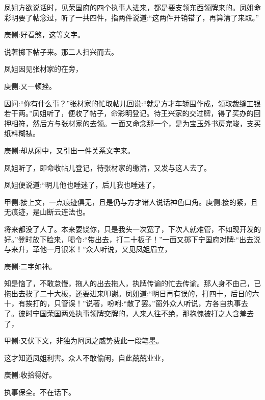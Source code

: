 \begin{parag}
    凤姐方欲说话时，见荣国府的四个执事人进来，都是要支领东西领牌来的。凤姐命彩明要了帖念过，听了一共四件，指两件说道:“这两件开销错了，再算清了来取。”\begin{note}庚侧:好看煞，这等文字。\end{note}说著掷下帖子来。那二人扫兴而去。
\end{parag}


\begin{parag}
    凤姐因见张材家的在旁，\begin{note}庚侧:又一顿挫。\end{note}因问:“你有什么事？”张材家的忙取帖儿回说:“就是方才车轿围作成，领取裁缝工银若干两。”凤姐听了，便收了帖子，命彩明登记。待王兴家的交过牌，得了买办的回押相符，然后方与张材家的去领。一面又命念那一个，是为宝玉外书房完竣，支买纸料糊裱。\begin{note}庚侧:却从闲中，又引出一件关系文字来。\end{note}凤姐听了，即命收帖儿登记，待张材家的缴清，又发与这人去了。
\end{parag}


\begin{parag}
    凤姐便说道:“明儿他也睡迷了，后儿我也睡迷了，\begin{note}甲侧:接上文，一点痕迹俱无，且是仍与方才诸人说话神色口角。庚侧:接的紧，且无痕迹，是山断云连法也。\end{note}将来都没了人了。本来要饶你，只是我头一次宽了，下次人就难管，不如现开发的好。”登时放下脸来，喝令:“带出去，打二十板子！”一面又掷下宁国府对牌:“出去说与来升，革他一月银米！”众人听说，又见凤姐眉立，\begin{note}庚侧:二字如神。\end{note}知是恼了，不敢怠慢，拖人的出去拖人，执牌传谕的忙去传谕。那人身不由己，已拖出去挨了二十大板，还要进来叩谢。凤姐道:“明日再有误的，打四十，后日的六十，有挨打的，只管误！”说著，吩咐:“散了罢。”窗外众人听说，方各自执事去了。彼时宁国荣国两处执事领牌交牌的，人来人往不绝，那抱愧被打之人含羞去了，\begin{note}甲侧:又伏下文，非独为阿凤之威势费此一段笔墨。\end{note}这才知道凤姐利害。众人不敢偷闲，自此兢兢业业，\begin{note}庚侧:收拾得好。\end{note}执事保全。不在话下。
\end{parag}


